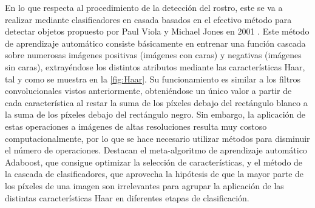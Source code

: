 En lo que respecta al procedimiento de la detección del rostro, este se va a realizar mediante clasificadores en casada basados en el efectivo método para detectar objetos propuesto por Paul Viola y Michael Jones en 2001 \cite{Viola}. Este método de aprendizaje automático consiste básicamente en entrenar una función cascada sobre numerosas imágenes positivas (imágenes con caras) y negativas (imágenes sin caras), extrayéndose los distintos atributos mediante las características Haar, tal y como se muestra en la \autoref{fig:Haar}. Su funcionamiento es similar a los filtros convolucionales vistos anteriormente, obteniéndose un único valor a partir de cada característica al restar la suma de los píxeles debajo del rectángulo blanco a la suma de los píxeles debajo del rectángulo negro. Sin embargo, la aplicación de estas operaciones a imágenes de altas resoluciones resulta muy costoso computacionalmente, por lo que se hace necesario utilizar métodos para disminuir el número de operaciones. Destacan el meta-algoritmo de aprendizaje automático Adaboost, que consigue optimizar la selección de características, y el método de la cascada de clasificadores, que aprovecha la hipótesis de que la mayor parte de los píxeles de una imagen son irrelevantes para agrupar la aplicación de las distintas características Haar en diferentes etapas de clasificación.

